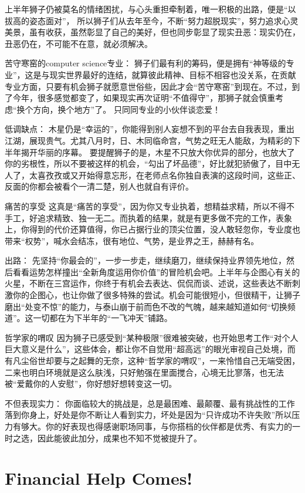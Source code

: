 \documentclass[12pt]{book}
\begin{document}
上半年狮子仍被莫名的情绪困扰，与心头重担牵制着，唯一积极的出路，便是“以拔高的姿态面对”，
所以狮子们从去年至今，不断“努力超脱现实”，努力追求心灵美景，虽有收获，虽然彰显了自己的美好，但也同步彰显了现实丑恶：现实仍在，丑恶仍在，不可能不在意，就必须解决。 

苦守寒窑的computer science专业：
狮子们最有利的筹码，便是拥有“神等级的专业”，这是与现实世界最好的连结，就算彼此精神、目标不相容也没关系，在贡献专业方面，只要有机会狮子就愿意世俗些，因此才会“苦守寒窑”到现在。不过，到了今年，很多感觉都变了，如果现实再次证明“不值得守”，那狮子就会慎重考虑“换个方向，换个地方”了。 
只同同专业的小伙伴谈恋爱！

低调缺点：
木星仍是“幸运的”，你能得到别人妄想不到的平台去自我表现，重出江湖，展现贵气。尤其八月时，日、木同临命宫，气势之旺无人能敌，为精彩的下半年揭开华丽的序幕。 
要提醒狮子的是，木星不只放大你优异的部分，也放大了你的劣根性，所以不要被这样的机会，“勾出了坏品德”，好比就犯骄傲了，目中无人了，太喜孜孜或又开始得意忘形，在老师点名你独自表演的这段时间，这些正、反面的你都会被看个一清二楚，别人也就自有评价。

痛苦的享受
这真是“痛苦的享受”，因为你又专业执着，想精益求精，所以不得不手工，好追求精致、独一无二。而执着的结果，就是有更多做不完的工作，表象上，你得到的代价还算值得，你已占据行业的顶尖位置，没人敢轻忽你，专业度也带来“权势”，喊水会结冻，很有地位、气势，是业界之王，赫赫有名。 

出路：
先坚持“你最会的”，一步一步走，继续磨刀，继续保持业界领先地位，然后看看运势怎样撞出“全新角度运用你价值”的冒险机会吧。上半年与企图心有关的火星，不断在三宫运作，你终于有机会去表达、侃侃而谈、述说，这些表达不断刺激你的企图心，也让你做了很多特殊的尝试。机会可能很短小，但很精干，让狮子磨出“处变不惊”的能力，与泰山崩于前而色不改的气魄，越来越知道如何“切换频道”。这一切都在为下半年的“一飞冲天”铺路。 

哲学家的喟叹
因为狮子已感受到“某种极限”很难被突破，也开始思考工作“对个人巨大意义是什么”，这些体会，都让你不自觉用“超高远”的眼光审视自己处境，而有凡尘俗世却要与之起舞的无奈，这种“哲学家的喟叹”，一来怜惜自己无端受困，二来也明白环境就是这么肤浅，只好勉强在里面搅合，心境无比寥落，也无法被“爱戴你的人安慰”，你好想好想转变这一切。 

不但表现实力：
你面临较大的挑战是，总是最困难、最颠覆、最有挑战性的工作落到你身上，好处是你不断让人看到实力，坏处是因为“只许成功不许失败”所以压力有够大。你的好表现也得感谢职场同事，与你搭档的伙伴都是优秀、有实力的一时之选，因此能彼此加分，成果也不知不觉被提升了。 

\chapter{Financial Help Comes!}
\label{sec-47}
\end{document}
